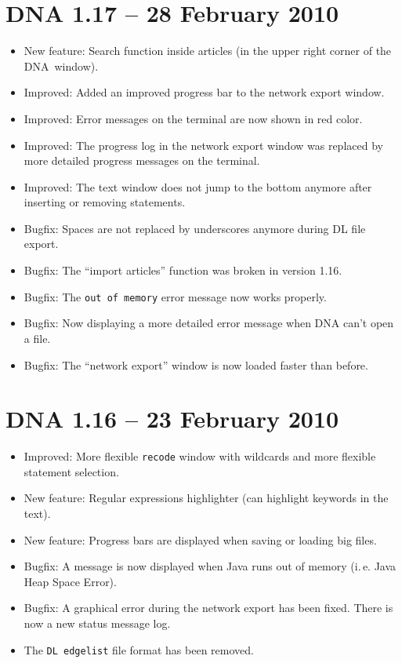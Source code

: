 \documentclass[12pt,a4paper]{scrreprt}
\newcommand{\dnashort}{\textsc{DNA}}
\newcommand{\code}[1]{\texttt{#1}}
\begin{document}
\section*{DNA 1.17 -- 28 February 2010}
\begin{itemize}
 \item New feature: Search function inside articles (in the upper right corner of the \dnashort\ window).
 \item Improved: Added an improved progress bar to the network export window.
 \item Improved: Error messages on the terminal are now shown in red color.
 \item Improved: The progress log in the network export window was replaced by more detailed progress messages on the terminal.
 \item Improved: The text window does not jump to the bottom anymore after inserting or removing statements.
 \item Bugfix: Spaces are not replaced by underscores anymore during DL file export.
 \item Bugfix: The ``import articles'' function was broken in version 1.16.
 \item Bugfix: The \code{out of memory} error message now works properly.
 \item Bugfix: Now displaying a more detailed error message when DNA can't open a file.
 \item Bugfix: The ``network export'' window is now loaded faster than before.
\end{itemize}

\section*{DNA 1.16 -- 23 February 2010}
\begin{itemize}
 \item Improved: More flexible \code{recode} window with wildcards and more flexible statement selection.
 \item New feature: Regular expressions highlighter (can highlight keywords in the text).
 \item New feature: Progress bars are displayed when saving or loading big files.
 \item Bugfix: A message is now displayed when Java runs out of memory (i.\,e. Java Heap Space Error).
 \item Bugfix: A graphical error during the network export has been fixed. There is now a new status message log.
 \item The \code{DL edgelist} file format has been removed.
\end{itemize}
\end{document}

